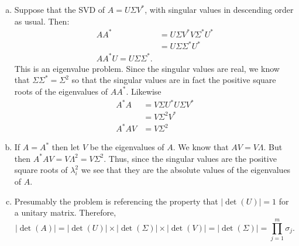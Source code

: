 \documentclass[letter, 12pt]{article}
\begin{document}
\begin{enumerate}[(a)]
\item Suppose that the SVD of $A = U\Sigma V^*$, with singular values in descending order as usual. Then:
\begin{align*}
AA^* & = U\Sigma V^* V \Sigma^* U^* \\
& = U\Sigma\Sigma^* U^* \\
AA^* U = U \Sigma\Sigma^*.
\end{align*}
This is an eigenvalue problem. Since the singular values are real, we know that $\Sigma\Sigma^* = \Sigma^2$ so that the singular values are in fact the positive square roots of the eigenvalues of $AA^*$. Likewise
\begin{align*}
A^*A & = V\Sigma U^*U\Sigma V^* \\
& = V\Sigma^2V^* \\
A^*A V & = V\Sigma^2
\end{align*}
\item If $A=A^*$ then let $V$ be the eigenvalues of $A$. We know that $AV = V \Lambda$. But then $A^*AV = V \Lambda^2 = V\Sigma^2$. Thus, since the singular values are the positive square roots of $\lambda_i^2$ we see that they are the absolute values of the eigenvalues of $A$.
\item Presumably the problem is referencing the property that $|\det(U)| = 1$ for a unitary matrix. Therefore, \[|\det(A)| = |\det(U)|\times |\det(\Sigma)| \times |\det(V)| = |\det(\Sigma)| = \prod_{j=1}^m \sigma_j.\]
\end{enumerate}

\pagebreak
\end{document}

